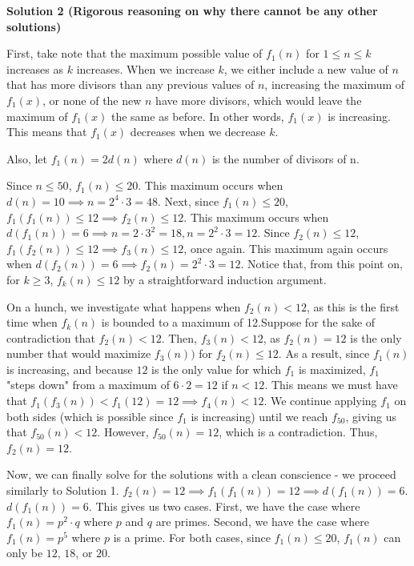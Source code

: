 \begin{enumerate}
 



\textbf{Solution 2 (Rigorous reasoning on why there cannot be any other solutions)}

First, take note that the maximum possible value of $f_1(n)$ for $1 \le n \le k$ increases as $k$ increases. When we increase $k$, we either include a new value of $n$ that has more divisors than any previous values of $n$, increasing the maximum of $f_1(x)$, or none of the new $n$ have more divisors, which would leave the maximum of $f_1(x)$ the same as before. In other words, $f_1(x)$ is increasing. This means that $f_1(x)$ decreases when we decrease $k$. 

 Also, let $f_1(n) = 2d(n)$ where $d(n)$ is the number of divisors of n.

 Since $n \le 50$, $f_1(n) \le 20$. This maximum occurs when $d(n) = 10 \implies n = 2^4 \cdot 3 = 48$. Next, since $f_1(n) \le 20$, $f_1(f_1(n)) \le 12 \implies f_2(n) \le 12$. This maximum occurs when $d(f_1(n)) = 6 \implies n = 2 \cdot 3^2 = 18, n = 2^2 \cdot 3 = 12$. Since $f_2(n) \le 12$, $f_1(f_2(n)) \le 12 \implies f_3(n) \le 12$, once again. This maximum again occurs when $d(f_2(n)) = 6 \implies f_2(n) = 2^2 \cdot 3 = 12$. Notice that, from this point on, for $k \geq 3$, $f_k(n) \leq 12$ by a straightforward induction argument.

 On a hunch, we investigate what happens when $f_2(n) < 12$, as this is the first time when $f_k(n)$ is bounded to a maximum of 12.Suppose for the sake of contradiction that $f_2(n) < 12$. Then, $f_3(n) < 12$, as $f_2(n) = 12$ is the only number that would maximize $f_3(n))$ for $f_2(n) \le 12$. As a result, since $f_1(n)$ is increasing, and because $12$ is the only value for which $f_1$  is maximized, $f_1$ "steps down" from a maximum of $6 \cdot 2 = 12$ if $n < 12$. This means we must have that $f_1(f_3(n)) < f_1(12) = 12 \implies f_4(n) < 12$. We continue applying $f_1$ on both sides (which is possible since $f_1$ is increasing) until we reach $f_{50}$, giving us that $f_{50}(n) < 12$. However, $f_{50}(n) = 12$, which is a contradiction. Thus, $f_2(n) = 12$. 

 Now, we can finally solve for the solutions with a clean conscience - we proceed similarly to Solution 1. $f_2(n) = 12 \implies f_1(f_1(n)) = 12 \implies d(f_1(n)) = 6$. $d(f_1(n)) = 6$. This gives us two cases. First, we have the case where $f_1(n) = p^2 \cdot q$ where $p$ and $q$ are primes. Second, we have the case where $f_1(n)=p^5$ where $p$ is a prime.  For both cases, since $f_1(n) \le 20$, $f_1(n)$ can only be $12$, $18$, or $20$.


\end{enumerate}
